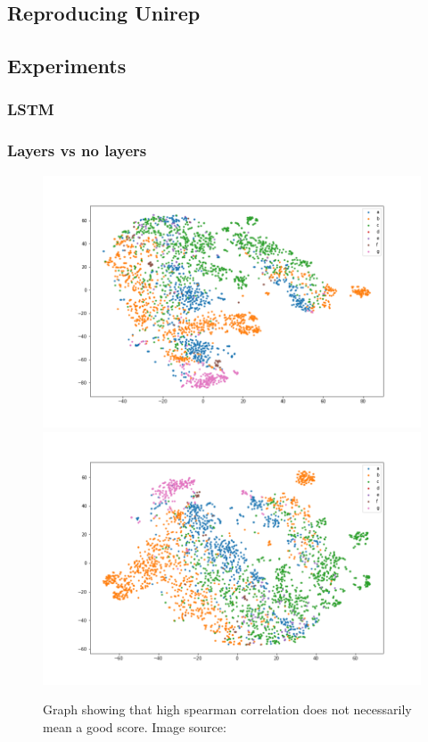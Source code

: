 \subsection{Reproducing Unirep}
\subsection{Experiments}

\subsubsection{LSTM}

\subsubsection{Layers vs no layers} %
\begin{figure}[!ht]
  \centering
  \includegraphics[width=0.4\linewidth]{latex/imgs/tsne_2_layer_05_drop_final.png}
  \includegraphics[width=0.4\linewidth]{latex/imgs/tsne_2_layer_05_drop_minloss.png}
  \caption{Graph showing that high spearman correlation does not necessarily mean a good score. Image source:\cite{spearman}}
\end{figure}
